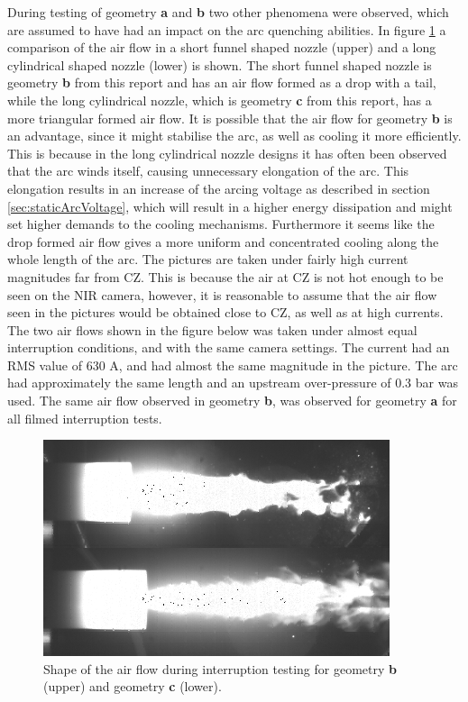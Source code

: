 \documentclass[10pt,b5paper,twoside]{article}
\begin{document}
During testing of geometry \textbf{a} and \textbf{b} two other phenomena were observed, which are assumed to have had an impact on the arc quenching abilities. In figure \ref{fig:funnelDisp} a comparison of the air flow in a short funnel shaped nozzle (upper) and a long cylindrical shaped nozzle (lower) is shown. The short funnel shaped nozzle is geometry \textbf{b} from this report and has an air flow formed as a drop with a tail, while the long cylindrical nozzle, which is geometry \textbf{c} from this report, has a more triangular formed air flow. It is possible that the air flow for geometry \textbf{b} is an advantage, since it might stabilise the arc, as well as cooling it more efficiently. This is because in the long cylindrical nozzle designs it has often been observed that the arc winds itself, causing unnecessary elongation of the arc. This elongation results in an increase of the arcing voltage as described in section \ref{sec:staticArcVoltage}, which will result in a higher energy dissipation and might set higher demands to the cooling mechanisms. Furthermore it seems like the drop formed air flow gives a more uniform and concentrated cooling along the whole length of the arc. The pictures are taken under fairly high current magnitudes far from CZ. This is because the air at CZ is not hot enough to be seen on the NIR camera, however, it is reasonable to assume that the air flow seen in the pictures would be obtained close to CZ, as well as at high currents. The two air flows shown in the figure below was taken under almost equal interruption conditions, and with the same camera settings. The current had an RMS value of 630 A, and had almost the same magnitude in the picture. The arc had approximately the same length and an upstream over-pressure of 0.3 bar was used. The same air flow observed in geometry \textbf{b}, was observed for geometry \textbf{a} for all filmed interruption tests.

\begin{figure}[H]
\centering
\includegraphics[scale=0.75]{Bilder/Results/compFunnelNormal.png}
\caption{Shape of the air flow during interruption testing for geometry \textbf{b} (upper) and geometry \textbf{c} (lower).} \label{fig:funnelDisp}
\end{figure}
\end{document}
